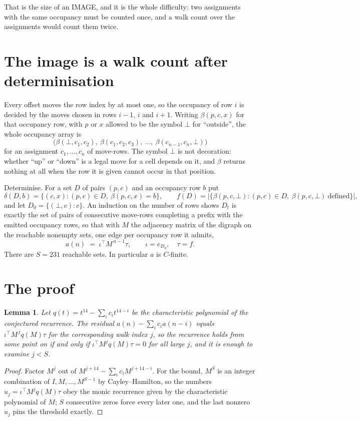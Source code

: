 \documentclass[11pt,a4paper]{article}
\theoremstyle{plain}
\newtheorem{lemma}[theorem]{Lemma}
\theoremstyle{definition}
\begin{document}
That is the size of an IMAGE, and it is the whole difficulty: two assignments with the same
occupancy must be counted once, and a walk count over the assignments would count them twice.

\section{The image is a walk count after determinisation}

Every offset moves the row index by at most one, so the occupancy of row $i$ is decided by the
moves chosen in rows $i-1$, $i$ and $i+1$. Writing $\beta(p,c,x)$ for that occupancy row, with
$p$ or $x$ allowed to be the symbol $\bot$ for ``outside'', the whole occupancy array is
\[
\bigl(\beta(\bot,c_1,c_2),\ \beta(c_1,c_2,c_3),\ \dots,\ \beta(c_{n-1},c_n,\bot)\bigr)
\]
for an assignment $c_1,\dots,c_n$ of move-rows. The symbol $\bot$ is not decoration: whether
``up'' or ``down'' is a legal move for a cell depends on it, and $\beta$ returns nothing at all
when the row it is given cannot occur in that position.

Determinise. For a set $D$ of pairs $(p,c)$ and an occupancy row $b$ put
\[
\delta(D,b)=\{(c,x):(p,c)\in D,\ \beta(p,c,x)=b\},\qquad
f(D)=\bigl|\{\beta(p,c,\bot):(p,c)\in D,\ \beta(p,c,\bot)\ \text{defined}\}\bigr| ,
\]
and let $D_0=\{(\bot,c):c\}$. An induction on the number of rows shows $D_t$ is exactly the
set of pairs of consecutive move-rows completing a prefix with the emitted occupancy rows, so
that with $M$ the adjacency matrix of the digraph on the reachable nonempty sets, one edge per
occupancy row it admits,
\[
a(n)\;=\;\iota^{\!\top}M^{\,n-1}\tau,\qquad \iota=e_{D_0},\quad \tau=f .
\]
There are $S=231$ reachable sets. In particular $a$ is $C$-finite.

\section{The proof}

\begin{lemma}\label{lem:crit}
Let $q(t)=t^{14}-\sum_i c_it^{14-i}$ be the characteristic polynomial of the
conjectured recurrence. The residual $a(n)-\sum_ic_ia(n-i)$ equals
$\iota^{\!\top}M^{\,j}q(M)\tau$ for the corresponding walk index $j$, so the recurrence
holds from some point on if and only if $\iota^{\!\top}M^{j}q(M)\tau=0$ for all large $j$,
and it is enough to examine $j<S$.
\end{lemma}

\begin{proof}
Factor $M^{j}$ out of $M^{j+14}-\sum_ic_iM^{j+14-i}$. For the bound, $M^{S}$
is an integer combination of $I,M,\dots,M^{S-1}$ by Cayley--Hamilton, so the numbers
$u_j=\iota^{\!\top}M^{j}q(M)\tau$ obey the monic recurrence given by the characteristic
polynomial of $M$; $S$ consecutive zeros force every later one, and the last nonzero $u_j$
pins the threshold exactly.
\end{proof}
\end{document}
